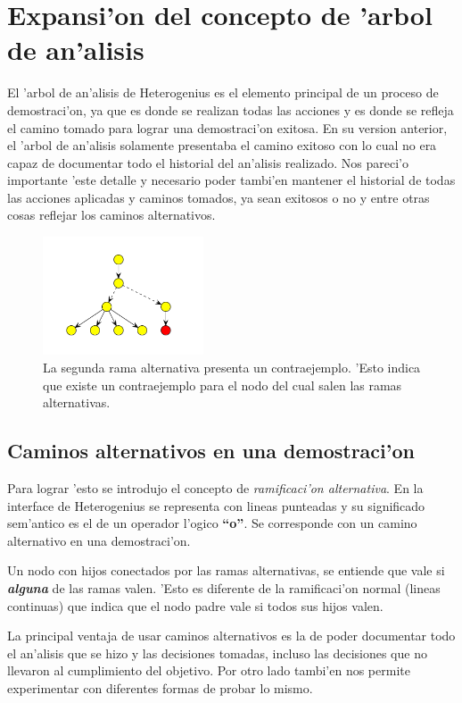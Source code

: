 \section{Expansi'on del concepto de 'arbol de an'alisis}

El 'arbol de an'alisis de Heterogenius es el elemento principal de un proceso de demostraci'on, ya que es donde se realizan todas las acciones y es donde se refleja el camino tomado para lograr una demostraci'on exitosa. En su version anterior, el 'arbol de an'alisis solamente presentaba el camino exitoso con lo cual no era capaz de documentar todo el historial del an'alisis realizado. Nos pareci'o importante 'este detalle y necesario poder tambi'en mantener el historial de todas las acciones aplicadas y caminos tomados, ya sean exitosos o no y entre otras cosas reflejar los caminos alternativos.

\begin{figure}[H]
	\includegraphics[width=180px]{img/ramas_alternativas_2.png}
	\centering
	\caption{La segunda rama alternativa presenta un contraejemplo. 'Esto indica que existe un contraejemplo para el nodo del cual salen las ramas alternativas.}
\end{figure}

\subsection{Caminos alternativos en una demostraci'on}

Para lograr 'esto se introdujo el concepto de \textit{ramificaci'on alternativa}. En la interface de Heterogenius se representa con lineas punteadas y su significado sem'antico es el de un operador l'ogico \textbf{``o''}. Se corresponde con un camino alternativo en una demostraci'on.

Un nodo con hijos conectados por las ramas alternativas, se entiende que vale si \textit{\textbf{alguna}} de las ramas valen. 'Esto es diferente de la ramificaci'on normal (lineas continuas) que indica que el nodo padre vale si todos sus hijos valen.
 
La principal ventaja de usar caminos alternativos es la de poder documentar todo el an'alisis que se hizo y las decisiones tomadas, incluso las decisiones que no llevaron al cumplimiento del objetivo. Por otro lado tambi'en nos permite experimentar con diferentes formas de probar lo mismo.

